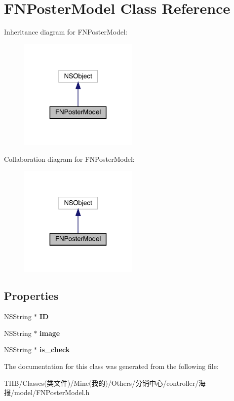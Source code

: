 \hypertarget{interface_f_n_poster_model}{}\section{F\+N\+Poster\+Model Class Reference}
\label{interface_f_n_poster_model}


Inheritance diagram for F\+N\+Poster\+Model\+:\nopagebreak
\begin{figure}[H]
\begin{center}
\leavevmode
\includegraphics[width=165pt]{interface_f_n_poster_model__inherit__graph}
\end{center}
\end{figure}


Collaboration diagram for F\+N\+Poster\+Model\+:\nopagebreak
\begin{figure}[H]
\begin{center}
\leavevmode
\includegraphics[width=165pt]{interface_f_n_poster_model__coll__graph}
\end{center}
\end{figure}
\subsection*{Properties}
\begin{DoxyCompactItemize}
\item 
\mbox{\label{interface_f_n_poster_model_a3a54d83b6f7f348bb7f83d65556cf64e}} 
N\+S\+String $\ast$ {\bfseries ID}
\item 
\mbox{\label{interface_f_n_poster_model_a03d88260a16516f38c242d0aacea4ef0}} 
N\+S\+String $\ast$ {\bfseries image}
\item 
\mbox{\label{interface_f_n_poster_model_a366c68c74b69cf6a99b06bb47b38f826}} 
N\+S\+String $\ast$ {\bfseries is\+\_\+check}
\end{DoxyCompactItemize}


The documentation for this class was generated from the following file\+:\begin{DoxyCompactItemize}
\item 
T\+H\+B/\+Classes(类文件)/\+Mine(我的)/\+Others/分销中心/controller/海报/model/F\+N\+Poster\+Model.\+h\end{DoxyCompactItemize}
